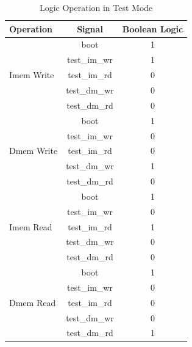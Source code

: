 \documentclass[a4paper]{article}
\begin{document}
\begin{table}[htp]
	\caption{Logic Operation in Test Mode}\label{tab:logic}
	\begin{center}
		\begin{tabular}{|l|c|c|}
		\hline
		\textbf{Operation}	& \textbf{Signal}	& \textbf{Boolean Logic} \\ \hline
		\multirow{5}{*}{Imem Write}& boot		& 1 \\ \cline{2-3}
							& test\_im\_wr 		& 1 \\ \cline{2-3}
							& test\_im\_rd 		& 0 \\ \cline{2-3}
							& test\_dm\_wr 		& 0 \\ \cline{2-3}
							& test\_dm\_rd 		& 0 \\ \hline
		\multirow{5}{*}{Dmem Write}& boot 		& 1 \\ \cline{2-3}
							& test\_im\_wr 		& 0 \\ \cline{2-3}
							& test\_im\_rd 		& 0 \\ \cline{2-3} 
							& test\_dm\_wr 		& 1 \\ \cline{2-3}
							& test\_dm\_rd 		& 0 \\ \hline
		\multirow{5}{*}{Imem Read}& boot 		& 1 \\ \cline{2-3}
							& test\_im\_wr 		& 0 \\ \cline{2-3}
							& test\_im\_rd 		& 1 \\ \cline{2-3} 
							& test\_dm\_wr 		& 0 \\ \cline{2-3}
							& test\_dm\_rd 		& 0 \\ \hline
		\multirow{5}{*}{Dmem Read}& boot 		& 1 \\ \cline{2-3}
							& test\_im\_wr 		& 0 \\ \cline{2-3}
							& test\_im\_rd 		& 0 \\ \cline{2-3} 
							& test\_dm\_wr 		& 0 \\ \cline{2-3}
							& test\_dm\_rd 		& 1 \\ \hline
		\end{tabular}
	\end{center}
\end{table}
\end{document}
